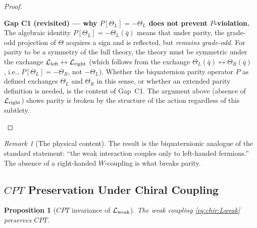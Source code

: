\documentclass[12pt,a4paper]{article}
\newtheorem{proposition}[theorem]{Proposition}
\theoremstyle{definition}
\theoremstyle{remark}
\newtheorem{remark}[theorem]{Remark}
\begin{document}
\begin{proof}
\begin{gapbox}
\textbf{Gap C1 (revisited) — why $P[\Theta_L] = -\Theta_L$ does not prevent $P$-violation.}
The algebraic identity $P[\Theta_L] = -\Theta_L(\bar{q})$ means that under parity,
the grade-odd projection of $\Theta$ acquires a sign and is reflected, but
\emph{remains grade-odd}.  For parity to be a symmetry of the full theory,
the theory must be symmetric under the exchange
$\mathcal{L}_{\rm left} \leftrightarrow \mathcal{L}_{\rm right}$ (which follows
from the exchange $\Theta_L(\bar{q})\leftrightarrow \Theta_R(\bar{q})$, i.e.,
$P[\Theta_L] = -\Theta_R$, not $-\Theta_L$).  Whether the biquaternion parity
operator $P$ as defined exchanges $\Theta_L$ and $\Theta_R$ in this sense,
or whether an extended parity definition is needed, is the content of Gap~C1.
The argument above (absence of $\mathcal{L}_{\rm right}$) shows parity is
broken by the structure of the action regardless of this subtlety.
\end{gapbox}
\end{proof}

\begin{remark}[The physical content]
The result is the biquaternionic analogue of the standard statement:
``the weak interaction couples only to left-handed fermions.''
The absence of a right-handed $W$-coupling is what breaks parity.
\end{remark}

\subsection{$CPT$ Preservation Under Chiral Coupling}

\begin{proposition}[$CPT$ invariance of $\mathcal{L}_{\rm weak}$]
\label{prop:chir:CPT_weak}
The weak coupling \eqref{eq:chir:Lweak} preserves $CPT$.
\end{proposition}
\end{document}
